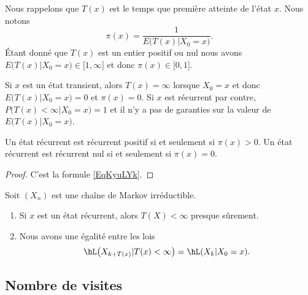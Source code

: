 Nous rappelons que \( T(x)\) est le temps que première atteinte de l'état \( x\). Nous notons
\begin{equation}        \label{EqKyuLYk}
    \pi(x)=\frac{1}{ E\big( T(x)|X_0=x \big) }.
\end{equation}
Étant donné que \( T(x)\) est un entier positif ou nul nous avons \( E\big( T(x)|X_0=x \big)\in\mathopen[ 1 , \infty \mathclose]\) et donc \( \pi(x)\in\mathopen[ 0 , 1 \mathclose]\).

Si \( x\) est un état transient, alors \( T(x)=\infty\) lorsque \( X_0=x\) et donc \( E\big( T(x)|X_0=x \big)=0\) et \( \pi(x)=0\). Si \( x\) est récurrent par contre, \( P\big( T(x)<\infty|X_0=x \big)=1\) et il n'y a pas de garanties sur la valeur de \( E\big( T(x)|X_0=x \big)\).

\begin{corollary}       \label{CorLhpRsk}
    Un état récurrent est récurrent positif si et seulement si \( \pi(x)>0\). Un état récurrent est récurrent nul si et seulement si \( \pi(x)=0\).
\end{corollary}

\begin{proof}
    C'est la formule \eqref{EqKyuLYk}.
\end{proof}

\begin{proposition} \label{PropMrkIrreLoishLCkpjkptXk}
    Soit \( (X_n)\) est une chaîne de Markov irréductible.
    \begin{enumerate}
        \item
            Si \( x\) est un état récurrent, alors \( T(X)<\infty\) presque sûrement.
        \item
            Nous avons une égalité entre les lois
            \begin{equation}    \label{PropMrkIrreLoishLCkpjkptXkItemii}
                \hL\big( X_{k+T(x)}|T(x)<\infty \big)=\hL(X_k|X_0=x).
            \end{equation}
    \end{enumerate}
\end{proposition}

\subsection{Nombre de visites}

